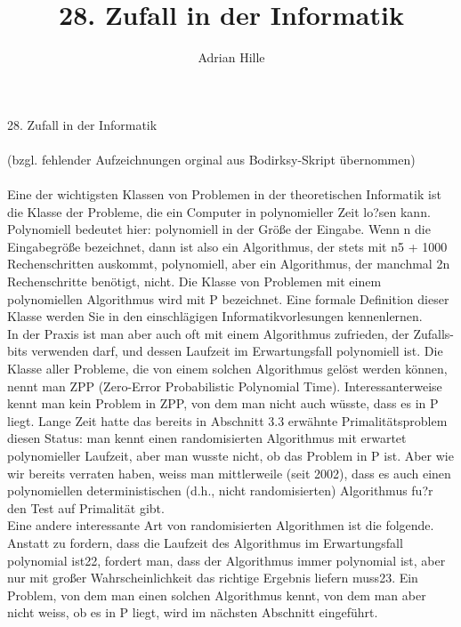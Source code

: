 \documentclass{scrartcl}
\title{28. Zufall in der Informatik}
\author{Adrian Hille}
\begin{document}
\Large 28. Zufall in der Informatik\\
\\
\normalsize
(bzgl. fehlender Aufzeichnungen orginal aus Bodirksy-Skript \"ubernommen)\\\\
Eine der wichtigsten Klassen von Problemen in der theoretischen Informatik ist die Klasse der Probleme, die ein Computer in polynomieller Zeit lo?sen kann. Polynomiell bedeutet hier: polynomiell in der Gr\"o\ss e der Eingabe. Wenn n die Eingabegr\"o\ss e bezeichnet, dann ist also ein Algorithmus, der stets mit n5 + 1000 Rechenschritten auskommt, polynomiell, aber ein Algorithmus, der manchmal 2n Rechenschritte ben\"otigt, nicht. Die Klasse von Problemen mit einem polynomiellen Algorithmus wird mit P bezeichnet. Eine formale Definition dieser Klasse werden Sie in den einschl\"agigen Informatikvorlesungen kennenlernen.\\
In der Praxis ist man aber auch oft mit einem Algorithmus zufrieden, der Zufalls- bits verwenden darf, und dessen Laufzeit im Erwartungsfall polynomiell ist. Die Klasse aller Probleme, die von einem solchen Algorithmus gel\"ost werden k\"onnen, nennt man ZPP (Zero-Error Probabilistic Polynomial Time). Interessanterweise kennt man kein Problem in ZPP, von dem man nicht auch w\"usste, dass es in P liegt. Lange Zeit hatte das bereits in Abschnitt 3.3 erw\"ahnte Primalit\"atsproblem diesen Status: man kennt einen randomisierten Algorithmus mit erwartet polynomieller Laufzeit, aber man wusste nicht, ob das Problem in P ist. Aber wie wir bereits verraten haben, weiss man mittlerweile (seit 2002), dass es auch einen polynomiellen deterministischen (d.h., nicht randomisierten) Algorithmus fu?r den Test auf Primalit\"at gibt.\\
Eine andere interessante Art von randomisierten Algorithmen ist die folgende. Anstatt zu fordern, dass die Laufzeit des Algorithmus im Erwartungsfall polynomial ist22, fordert man, dass der Algorithmus immer polynomial ist, aber nur mit gro\ss er Wahrscheinlichkeit das richtige Ergebnis liefern muss23. Ein Problem, von dem man einen solchen Algorithmus kennt, von dem man aber nicht weiss, ob es in P liegt, wird im n\"achsten Abschnitt eingef\"uhrt.\\
\end{document}
